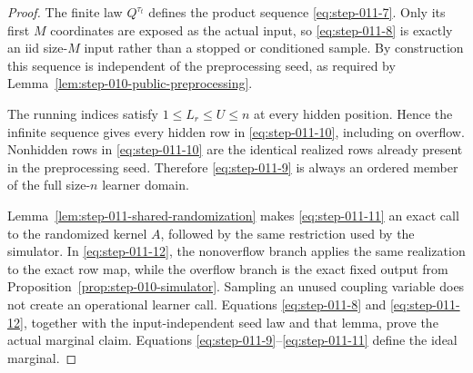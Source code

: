 \begin{proof}
The finite law \(Q^{\tau_t}\) defines the product sequence \eqref{eq:step-011-7}. Only its
first \(M\) coordinates are exposed as the actual input, so \eqref{eq:step-011-8} is exactly
an iid size-\(M\) input rather than a stopped or conditioned sample. By
construction this sequence is independent of the preprocessing seed, as
required by Lemma~\ref{lem:step-010-public-preprocessing}.

The running indices satisfy \(1\le L_r\le U\le n\) at every hidden
position. Hence the infinite sequence gives every hidden row in \eqref{eq:step-011-10},
including on overflow. Nonhidden rows in \eqref{eq:step-011-10} are the identical realized
rows already present in the preprocessing seed. Therefore \eqref{eq:step-011-9} is
always an ordered member of the full size-\(n\) learner domain.

Lemma~\ref{lem:step-011-shared-randomization} makes \eqref{eq:step-011-11} an exact call to
the randomized kernel \(A\), followed by
the same restriction used by the simulator. In \eqref{eq:step-011-12}, the
nonoverflow branch applies the same realization to the exact row
map, while the overflow branch is the exact fixed output from Proposition~\ref{prop:step-010-simulator}. Sampling an unused coupling
variable does not create an operational learner call. Equations \eqref{eq:step-011-8} and
\eqref{eq:step-011-12}, together with the input-independent seed law and that lemma, prove the
actual marginal claim. Equations \eqref{eq:step-011-9}--\eqref{eq:step-011-11} define the ideal marginal.
\end{proof}


